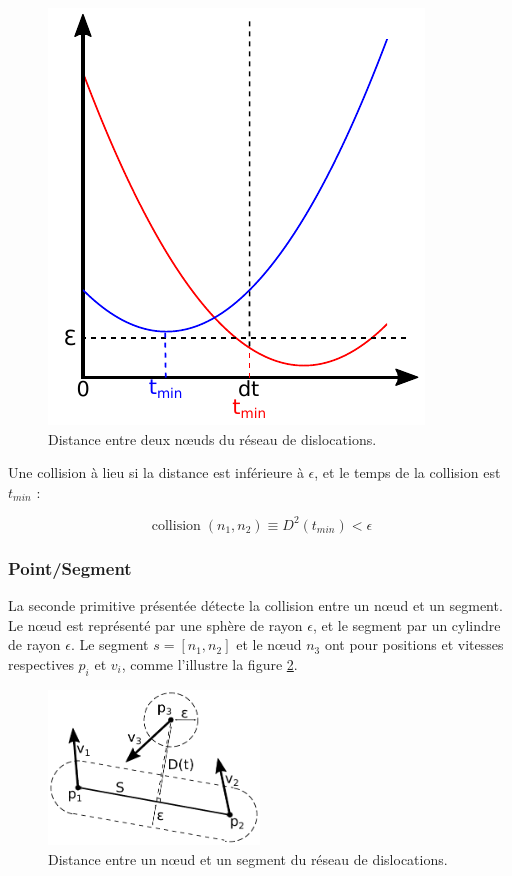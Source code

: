 \documentclass[11pt,class=article,float=false,crop=false]{standalone}
\begin{document}
\begin{figure}[H]
	\centering
	\includegraphics[height=0.3\textheight]{img/collision-primitive-pointpoint-polynome}
	\caption{Distance entre deux nœuds du réseau de dislocations.}
	\label{fig:collision-primitive-pointpoint-polynome}
\end{figure}

Une collision à lieu si la distance est inférieure à $\epsilon$, et le temps de la collision est $t_{min}$ :

\begin{equation}
	\operatorname{collision}(n_1,n_2) \equiv D^2(t_{min}) < \epsilon
\end{equation}

\subsubsection{Point/Segment}

La seconde primitive présentée détecte la collision entre un nœud et un segment. Le nœud est représenté par une sphère de rayon $\epsilon$, et le segment par un cylindre de rayon $\epsilon$. Le segment $s = [n_1,n_2]$ et le nœud $n_3$ ont pour positions et vitesses respectives $p_i$ et $v_i$, comme l'illustre la figure \ref{fig:collision-primitive-pointseg}.

\begin{figure}[H]
	\centering
	\includegraphics[width=0.5\textwidth]{img/collision-primitive-pointseg}
	\caption{Distance entre un nœud et un segment du réseau de dislocations.}
	\label{fig:collision-primitive-pointseg}
\end{figure}
\end{document}
